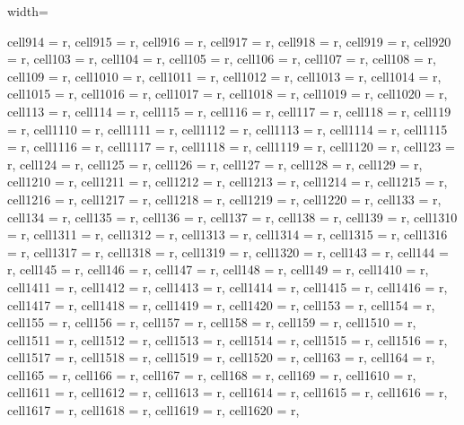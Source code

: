 \documentclass[lettersize,journal]{IEEEtran}
\begin{document}
\begin{table}
\begin{adjustbox}{width=\textwidth}
\begin{tblr}
{  cell{9}{14} = {r},  cell{9}{15} = {r},  cell{9}{16} = {r},  cell{9}{17} = {r},  cell{9}{18} = {r},  cell{9}{19} = {r},  cell{9}{20} = {r},  cell{10}{3} = {r},  cell{10}{4} = {r},  cell{10}{5} = {r},  cell{10}{6} = {r},  cell{10}{7} = {r},  cell{10}{8} = {r},  cell{10}{9} = {r},  cell{10}{10} = {r},  cell{10}{11} = {r},  cell{10}{12} = {r},  cell{10}{13} = {r},  cell{10}{14} = {r},  cell{10}{15} = {r},  cell{10}{16} = {r},  cell{10}{17} = {r},  cell{10}{18} = {r},  cell{10}{19} = {r},  cell{10}{20} = {r},  cell{11}{3} = {r},  cell{11}{4} = {r},  cell{11}{5} = {r},  
  cell{11}{6} = {r},  cell{11}{7} = {r},  cell{11}{8} = {r},  cell{11}{9} = {r},  cell{11}{10} = {r},  cell{11}{11} = {r},  cell{11}{12} = {r},  cell{11}{13} = {r},  cell{11}{14} = {r},  cell{11}{15} = {r},  cell{11}{16} = {r},  cell{11}{17} = {r},  cell{11}{18} = {r},  cell{11}{19} = {r},  cell{11}{20} = {r},  cell{12}{3} = {r},  cell{12}{4} = {r},  cell{12}{5} = {r},  cell{12}{6} = {r},  cell{12}{7} = {r},  cell{12}{8} = {r},  cell{12}{9} = {r},  cell{12}{10} = {r},  cell{12}{11} = {r},  cell{12}{12} = {r},  cell{12}{13} = {r},  cell{12}{14} = {r},  cell{12}{15} = {r},  
  cell{12}{16} = {r},  cell{12}{17} = {r},  cell{12}{18} = {r},  cell{12}{19} = {r},  cell{12}{20} = {r},  cell{13}{3} = {r},  cell{13}{4} = {r},  cell{13}{5} = {r},  cell{13}{6} = {r},  cell{13}{7} = {r},  cell{13}{8} = {r},  cell{13}{9} = {r},  cell{13}{10} = {r},  cell{13}{11} = {r},  cell{13}{12} = {r},  cell{13}{13} = {r},  cell{13}{14} = {r},  cell{13}{15} = {r},  cell{13}{16} = {r},  cell{13}{17} = {r},  cell{13}{18} = {r},  cell{13}{19} = {r},  cell{13}{20} = {r},  cell{14}{3} = {r},  cell{14}{4} = {r},  cell{14}{5} = {r},  cell{14}{6} = {r},  cell{14}{7} = {r},  
  cell{14}{8} = {r},  cell{14}{9} = {r},  cell{14}{10} = {r},  cell{14}{11} = {r},  cell{14}{12} = {r},  cell{14}{13} = {r},  cell{14}{14} = {r},  cell{14}{15} = {r},  cell{14}{16} = {r},  cell{14}{17} = {r},  cell{14}{18} = {r},  cell{14}{19} = {r},  cell{14}{20} = {r},  cell{15}{3} = {r},  cell{15}{4} = {r},  cell{15}{5} = {r},  cell{15}{6} = {r},  cell{15}{7} = {r},  cell{15}{8} = {r},  cell{15}{9} = {r},  cell{15}{10} = {r},  cell{15}{11} = {r},  cell{15}{12} = {r},  cell{15}{13} = {r},  cell{15}{14} = {r},  cell{15}{15} = {r},  cell{15}{16} = {r},  cell{15}{17} = {r},  
  cell{15}{18} = {r},  cell{15}{19} = {r},  cell{15}{20} = {r},  cell{16}{3} = {r},  cell{16}{4} = {r},  cell{16}{5} = {r},  cell{16}{6} = {r},  cell{16}{7} = {r},  cell{16}{8} = {r},  cell{16}{9} = {r},  cell{16}{10} = {r},  cell{16}{11} = {r},  cell{16}{12} = {r},  cell{16}{13} = {r},  cell{16}{14} = {r},  cell{16}{15} = {r},  cell{16}{16} = {r},  cell{16}{17} = {r},  cell{16}{18} = {r},  cell{16}{19} = {r},  cell{16}{20} = {r},  
}
\end{tblr}
\end{adjustbox}
\end{table}
\end{document}
